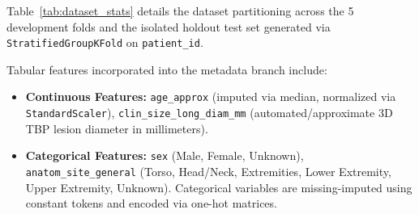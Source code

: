 \documentclass[12pt,a4paper]{report}
\begin{document}
	Table~\ref{tab:dataset_stats} details the dataset partitioning across the 5 development folds and the isolated holdout test set generated via \texttt{StratifiedGroupKFold} on \texttt{patient\_id}.
	
	\begin{table}[h!]
		\centering
		\caption{Patient-stratified dataset partition statistics across 5 cross-validation folds and the isolated holdout test set.}
		\label{tab:dataset_stats}
		\vspace{0.5em}
	\end{table}
	
	Tabular features incorporated into the metadata branch include:
	\begin{itemize}
		\item \textbf{Continuous Features:} \texttt{age\_approx} (imputed via median, normalized via \texttt{StandardScaler}), \texttt{clin\_size\_long\_diam\_mm} (automated/approximate 3D TBP lesion diameter in millimeters).
		\item \textbf{Categorical Features:} \texttt{sex} (Male, Female, Unknown), \texttt{anatom\_site\_general} (Torso, Head/Neck, Extremities, Lower Extremity, Upper Extremity, Unknown). Categorical variables are missing-imputed using constant tokens and encoded via one-hot matrices.
	\end{itemize}
	
\end{document}
